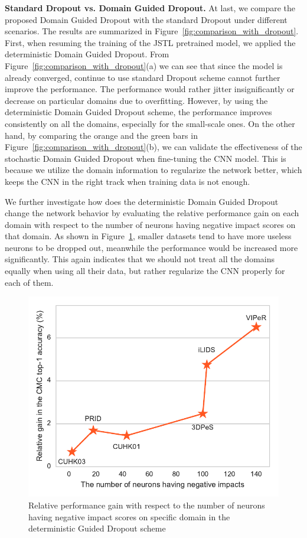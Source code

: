 \textbf{Standard Dropout vs. Domain Guided Dropout.} At last, we compare the proposed Domain Guided Dropout with the standard Dropout under different scenarios. The results are summarized in Figure~\ref{fig:comparison_with_dropout}. First, when resuming the training of the JSTL pretrained model, we applied the deterministic Domain Guided Dropout. From Figure~\ref{fig:comparison_with_dropout}(a) we can see that since the model is already converged, continue to use standard Dropout scheme cannot further improve the performance. The performance would rather jitter insignificantly or decrease on particular domains due to overfitting. However, by using the deterministic Domain Guided Dropout scheme, the performance improves consistently on all the domains, especially for the small-scale ones. On the other hand, by comparing the orange and the green bars in Figure~\ref{fig:comparison_with_dropout}(b), we can validate the effectiveness of the stochastic Domain Guided Dropout when fine-tuning the CNN model. This is because we utilize the domain information to regularize the network better, which keeps the CNN in the right track when training data is not enough.

We further investigate how does the deterministic Domain Guided Dropout change the network behavior by evaluating the relative performance gain on each domain with respect to the number of neurons having negative impact scores on that domain. As shown in Figure~\ref{fig:gain_wrt_neg_neurons}, smaller datasets tend to have more useless neurons to be dropped out, meanwhile the performance would be increased more significantly. This again indicates that we should not treat all the domains equally when using all their data, but rather regularize the CNN properly for each of them.

\begin{figure}[t]
\begin{center}
\includegraphics[width=0.8\linewidth]{figures/multi_domain/gain_wrt_neg_neurons.pdf}
\end{center}
\caption{Relative performance gain with respect to the number of neurons having negative impact scores on specific domain in the deterministic Guided Dropout scheme}
\label{fig:gain_wrt_neg_neurons}
\end{figure}

